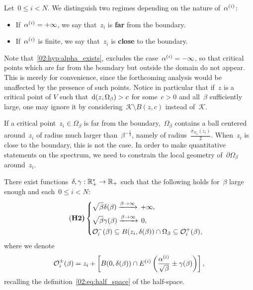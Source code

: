     Let~$0\leq i < N$. We distinguish two regimes depending on the nature of~$\alpha^{(i)}$:
    \begin{itemize}
        \item If~$\alpha^{(i)}= +\infty$, we say that~$z_i$ is {\bf far} from the boundary.
        \item If~$\alpha^{(i)}$ is finite, we say that~$z_i$ is {\bf close} to the boundary.
    \end{itemize}

    \begin{remark}
        Note that~\eqref{02:hyp:alpha_exists}, excludes the case~$\alpha^{(i)}=-\infty$, so that critical points which are far from the boundary but outside the domain do not appear.
        This is merely for convenience, since the forthcoming analysis would be unaffected by the presence of such points.
        Notice in particular that if~$z$ is a critical point of $V$ such that~$\mathrm{d}(z,\Omega_\beta)>c$ for some~$c>0$ and all~$\beta$ sufficiently large, one may ignore it by considering~$\mathcal K\setminus B(z,c)$ instead of~$\mathcal K$.
    \end{remark}
    If a critical point~$z_i \in \Omega_\beta$ is far from the boundary,~$\Omega_\beta$ contains a ball centered around~$z_i$ of radius much larger than~$\beta^{-\frac12}$, namely of radius~$\frac{\sigma_{\Omega_\beta}(z_i)}2$.
    When~$z_i$ is close to the boundary, this is not the case. In order to make quantitative statements on the spectrum, we need to constrain the local geometry of~$\partial\Omega_\beta$ around~$z_i$.
    \begin{hypothesis}     
        There exist functions~$\delta,\gamma:\mathbb{R}_+^*\to\mathbb{R}_+$ such that the following holds for~$\beta$ large enough and each~$0\leq i < N$:
        \begin{equation}
            \label{02:hyp:locally_flat}
            \tag{\bf H2}
            \left\{\begin{aligned}
                &\sqrt\beta\largeRadius(\beta)\xrightarrow{\beta\to\infty}\,+\infty,\\
                &\sqrt\beta\smallRadius(\beta)\xrightarrow{\beta\to\infty}\,0,\\
                &\localNeighborhood[-]{i}(\beta) \subseteq B(z_i,\largeRadius(\beta))\cap\Omega_\beta \subseteq \localNeighborhood[+]{i}(\beta),
            \end{aligned}\right.
        \end{equation}
        where we denote
        \begin{equation}
            \label{02:eq:capped_balls}
            \localNeighborhood[\pm]{i}(\beta) = z_i + \left[B(0,\largeRadius(\beta)) \cap \halfSpace{i}\left(\frac{\epsLimit{i}}{\sqrt\beta}\pm\smallRadius(\beta)\right)\right],
        \end{equation}
        recalling the definition~\eqref{02:eq:half_space} of the half-space.
    \end{hypothesis}
